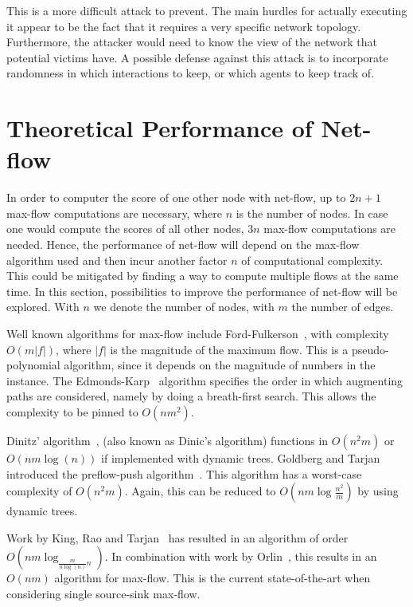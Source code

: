 \documentclass[a4paper,11pt]{book}
\theoremstyle{definition}
\begin{document}
This is a more difficult attack to prevent. The main hurdles for actually executing it appear to be
the fact that it requires a very specific network topology. Furthermore, the attacker would need to
know the view of the network that potential victims have. A possible defense against this attack is
to incorporate randomness in which interactions to keep, or which agents to keep track of.




\section{Theoretical Performance of Net-flow}

In order to computer the score of one other node with net-flow, up to $2n+1$ max-flow
computations are necessary, where $n$ is the number of nodes. In case one would compute
the scores of all other nodes, $3n$ max-flow computations are needed. Hence, the
performance of net-flow will depend on the max-flow algorithm used and then incur
another factor $n$ of computational complexity. This could be mitigated by finding
a way to compute multiple flows at the same time. In this section, possibilities
to improve the performance of net-flow will be explored. With $n$ we denote
the number of nodes, with $m$ the number of edges.

Well known algorithms for max-flow include Ford-Fulkerson~\cite{ford1956maximal},
with complexity $O(m|f|)$, where $|f|$ is the magnitude of the maximum flow. This
is a pseudo-polynomial algorithm, since it depends on the magnitude of numbers
in the instance.
The Edmonds-Karp~\cite{edmonds1972theoretical} algorithm specifies the order in which 
augmenting paths are considered, namely by doing a breath-first search. This allows
the complexity to be pinned to $O(nm^2)$.

Dinitz' algorithm~\cite{dinitz2006dinitz}, (also known as Dinic's algorithm) functions
in $O(n^2m)$ or $O(nm\log(n))$ if implemented with dynamic trees. Goldberg and Tarjan
introduced the preflow-push algorithm~\cite{goldberg1988new}. This algorithm
has a worst-case complexity of $O(n^2m)$. Again, this can be reduced to
$O(nm\log\frac{n^2}{m})$ by using dynamic trees.

Work by King, Rao and Tarjan~\cite{king1992faster} has resulted in an algorithm of
order $O(nm\log_{\frac{m}{n\log(n)}n})$. In combination with work by Orlin~\cite{orlin2013max},
this results in an $O(nm)$ algorithm for max-flow. This is the current state-of-the-art
when considering single source-sink max-flow.
\end{document}
